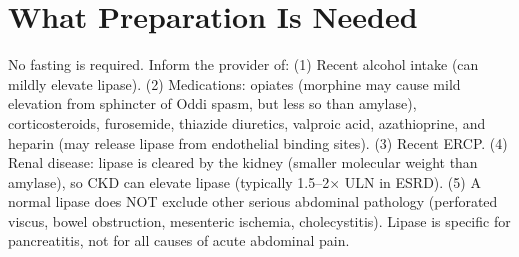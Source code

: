 \section*{What Preparation Is Needed}
No fasting is required. Inform the provider of: (1) Recent alcohol intake (can mildly elevate lipase). (2) Medications: opiates (morphine may cause mild elevation from sphincter of Oddi spasm, but less so than amylase), corticosteroids, furosemide, thiazide diuretics, valproic acid, azathioprine, and heparin (may release lipase from endothelial binding sites). (3) Recent ERCP. (4) Renal disease: lipase is cleared by the kidney (smaller molecular weight than amylase), so CKD can elevate lipase (typically 1.5--2$\times$ ULN in ESRD). (5) A normal lipase does NOT exclude other serious abdominal pathology (perforated viscus, bowel obstruction, mesenteric ischemia, cholecystitis). Lipase is specific for pancreatitis, not for all causes of acute abdominal pain.

